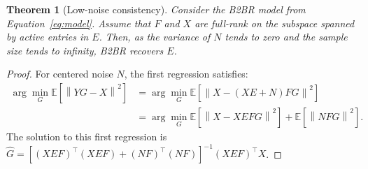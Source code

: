 \documentclass{article}
\newtheorem{theorem}{Theorem}
\begin{document}
\begin{theorem}[Low-noise consistency]
    Consider the B2BR model from Equation~\ref{eq:model}.
    Assume that $F$ and $X$ are full-rank on the subspace spanned by active entries in $E$. 
    Then, as the variance of $N$ tends to zero and the sample size tends to infinity, B2BR recovers $E$.
\end{theorem}
\begin{proof}
For centered noise $N$, the first regression satisfies:
\begin{align*}
    \arg \min_G \mathbb{E}[\left \| YG - X \right \|^2] &=   \arg \min_G \mathbb{E}[\left \| X - (XE + N)FG \right\|^2]\\
                                                        &{}= \arg \min_G \mathbb{E}[\left \| X - XEFG\right\| ^2]  + \mathbb{E}[\left \| NFG\right \| ^2].
\end{align*}
%
The solution to this first regression is $\hat{G} = [(XEF)^\top (XEF) + (NF)^\top (NF)]^{-1} (XEF)^\top X$.


\end{proof}
\end{document}
